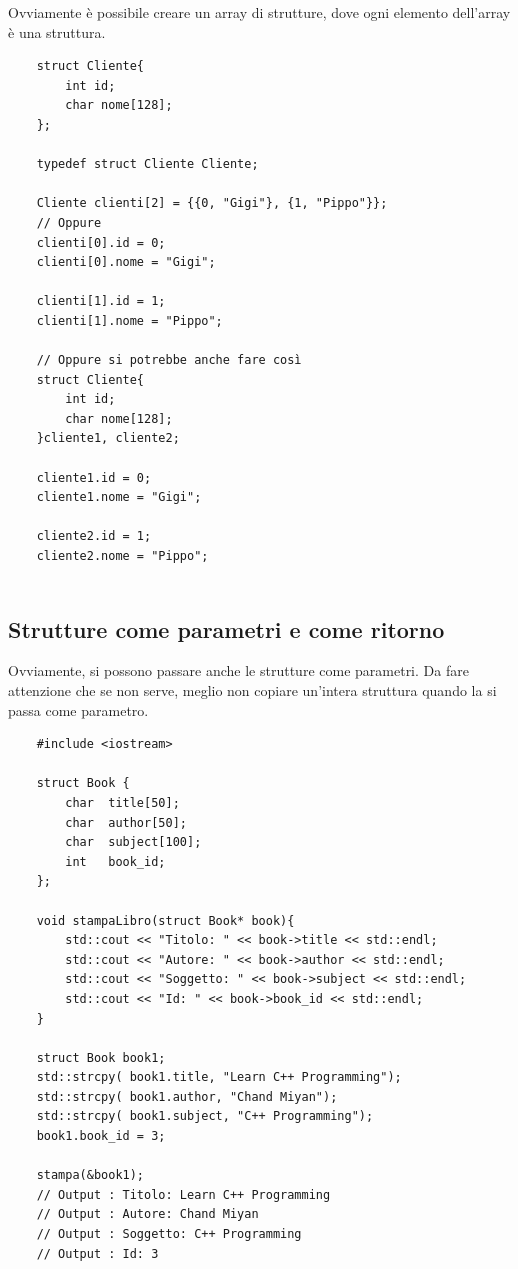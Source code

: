 \textsf{\small Ovviamente è possibile creare un array di strutture, dove ogni elemento dell'array è una struttura.} \\

\begin{lstlisting}
	struct Cliente{
		int id;
		char nome[128];
	};

	typedef struct Cliente Cliente;
	
	Cliente clienti[2] = {{0, "Gigi"}, {1, "Pippo"}};
	// Oppure
	clienti[0].id = 0;
	clienti[0].nome = "Gigi";
	
	clienti[1].id = 1;
	clienti[1].nome = "Pippo";
	
	// Oppure si potrebbe anche fare così
	struct Cliente{
		int id;
		char nome[128];
	}cliente1, cliente2;

	cliente1.id = 0;
	cliente1.nome = "Gigi";
	
	cliente2.id = 1;
	cliente2.nome = "Pippo";
	
\end{lstlisting}

\subsection{Strutture come parametri e come ritorno}

\textsf{\small Ovviamente, si possono passare anche le strutture come parametri. Da fare attenzione che se non serve, meglio non copiare un'intera struttura quando la si passa come parametro.}

\begin{lstlisting}
	#include <iostream>
	
	struct Book {
		char  title[50];
		char  author[50];
		char  subject[100];
		int   book_id;
	};
	
	void stampaLibro(struct Book* book){
		std::cout << "Titolo: " << book->title << std::endl;
		std::cout << "Autore: " << book->author << std::endl;
		std::cout << "Soggetto: " << book->subject << std::endl;
		std::cout << "Id: " << book->book_id << std::endl;
	}

	struct Book book1;
	std::strcpy( book1.title, "Learn C++ Programming");
	std::strcpy( book1.author, "Chand Miyan"); 
	std::strcpy( book1.subject, "C++ Programming");
	book1.book_id = 3;
	
	stampa(&book1);
	// Output : Titolo: Learn C++ Programming
	// Output : Autore: Chand Miyan
	// Output : Soggetto: C++ Programming
	// Output : Id: 3
\end{lstlisting}

